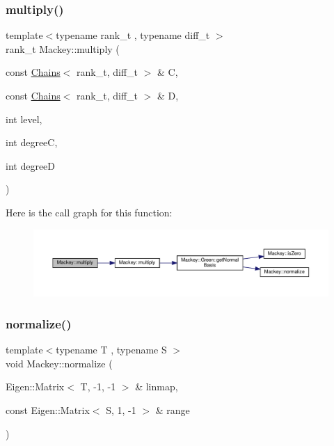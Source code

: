 \subsubsection{\texorpdfstring{multiply()}{multiply()}\hspace{0.1cm}{\footnotesize\ttfamily [2/2]}}
{\footnotesize\ttfamily template$<$typename rank\+\_\+t , typename diff\+\_\+t $>$ \\
rank\+\_\+t Mackey\+::multiply (\begin{DoxyParamCaption}\item[{const \hyperlink{classMackey_1_1Chains}{Chains}$<$ rank\+\_\+t, diff\+\_\+t $>$ \&}]{C,  }\item[{const \hyperlink{classMackey_1_1Chains}{Chains}$<$ rank\+\_\+t, diff\+\_\+t $>$ \&}]{D,  }\item[{int}]{level,  }\item[{int}]{degreeC,  }\item[{int}]{degreeD }\end{DoxyParamCaption})}

Here is the call graph for this function\+:\nopagebreak
\begin{figure}[H]
\begin{center}
\leavevmode
\includegraphics[width=350pt]{namespaceMackey_a2eca4cc709501ad3fc20b82fe4bcbd33_cgraph}
\end{center}
\end{figure}
\mbox{\label{namespaceMackey_a5ae32d04bca298d2d8735635ae45b971}} 
\subsubsection{\texorpdfstring{normalize()}{normalize()}\hspace{0.1cm}{\footnotesize\ttfamily [1/2]}}
{\footnotesize\ttfamily template$<$typename T , typename S $>$ \\
void Mackey\+::normalize (\begin{DoxyParamCaption}\item[{Eigen\+::\+Matrix$<$ T, -\/1, -\/1 $>$ \&}]{linmap,  }\item[{const Eigen\+::\+Matrix$<$ S, 1, -\/1 $>$ \&}]{range }\end{DoxyParamCaption})}



